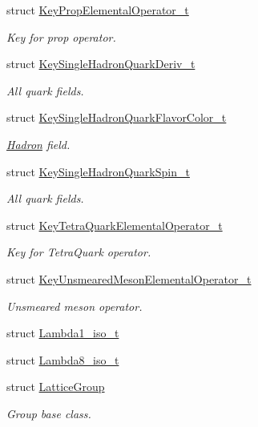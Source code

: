 \begin{DoxyCompactItemize}
struct \mbox{\hyperlink{structHadron_1_1KeyPropElementalOperator__t}{Key\+Prop\+Elemental\+Operator\+\_\+t}}
\begin{DoxyCompactList}\small\item\em Key for prop operator. \end{DoxyCompactList}\item 
struct \mbox{\hyperlink{structHadron_1_1KeySingleHadronQuarkDeriv__t}{Key\+Single\+Hadron\+Quark\+Deriv\+\_\+t}}
\begin{DoxyCompactList}\small\item\em All quark fields. \end{DoxyCompactList}\item 
struct \mbox{\hyperlink{structHadron_1_1KeySingleHadronQuarkFlavorColor__t}{Key\+Single\+Hadron\+Quark\+Flavor\+Color\+\_\+t}}
\begin{DoxyCompactList}\small\item\em \mbox{\hyperlink{namespaceHadron}{Hadron}} field. \end{DoxyCompactList}\item 
struct \mbox{\hyperlink{structHadron_1_1KeySingleHadronQuarkSpin__t}{Key\+Single\+Hadron\+Quark\+Spin\+\_\+t}}
\begin{DoxyCompactList}\small\item\em All quark fields. \end{DoxyCompactList}\item 
struct \mbox{\hyperlink{structHadron_1_1KeyTetraQuarkElementalOperator__t}{Key\+Tetra\+Quark\+Elemental\+Operator\+\_\+t}}
\begin{DoxyCompactList}\small\item\em Key for Tetra\+Quark operator. \end{DoxyCompactList}\item 
struct \mbox{\hyperlink{structHadron_1_1KeyUnsmearedMesonElementalOperator__t}{Key\+Unsmeared\+Meson\+Elemental\+Operator\+\_\+t}}
\begin{DoxyCompactList}\small\item\em Unsmeared meson operator. \end{DoxyCompactList}\item 
struct \mbox{\hyperlink{structHadron_1_1Lambda1__iso__t}{Lambda1\+\_\+iso\+\_\+t}}
\item 
struct \mbox{\hyperlink{structHadron_1_1Lambda8__iso__t}{Lambda8\+\_\+iso\+\_\+t}}
\item 
struct \mbox{\hyperlink{structHadron_1_1LatticeGroup}{Lattice\+Group}}
\begin{DoxyCompactList}\small\item\em Group base class. \end{DoxyCompactList}\item 

\end{DoxyCompactItemize}
